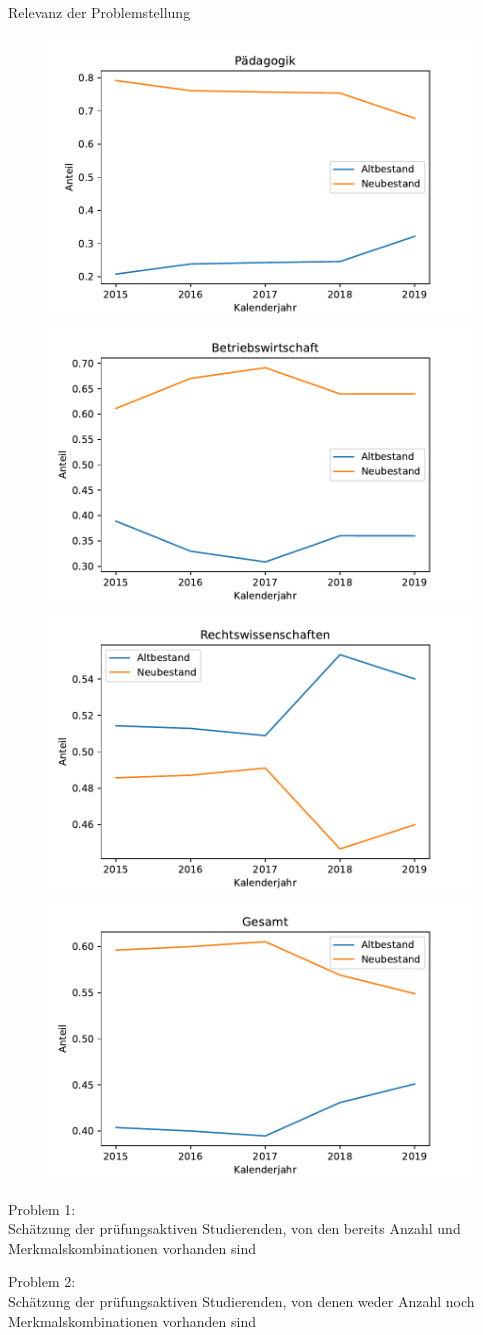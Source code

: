 \documentclass[17pt, fleqn]{beamer}
\begin{document}
\begin{frame}{Relevanz der Problemstellung}
    \begin{figure}
        \includegraphics[width = 0.5\columnwidth]{pad2.pdf}
        \includegraphics[width = 0.5\columnwidth]{bwl2.pdf}
        \includegraphics[width = 0.5\columnwidth]{jus2.pdf}
        \includegraphics[width = 0.5\columnwidth]{ges2.pdf}
    \end{figure}
    
\end{frame}

\begin{frame}
    Problem 1: \\
    Schätzung der prüfungsaktiven Studierenden, von den bereits Anzahl und Merkmalskombinationen vorhanden sind \\[1cm]

    \pause

    Problem 2: \\
    Schätzung der prüfungsaktiven Studierenden, von denen weder Anzahl noch Merkmalskombinationen vorhanden sind    
\end{frame}
\end{document}
